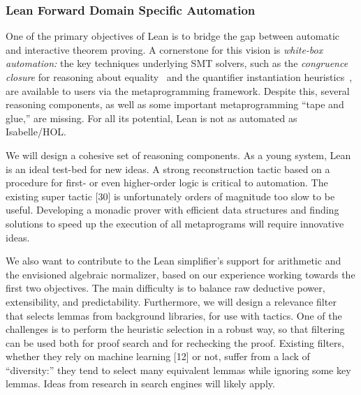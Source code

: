 \documentclass[11pt]{amsart}  %
\begin{document}
\subsubsection{Lean Forward Domain Specific Automation}
One of the primary objectives of Lean is to bridge the gap between automatic and interactive theorem proving. A cornerstone for this vision is \emph{white-box automation:} the key techniques underlying SMT solvers, such as the \emph{congruence closure} for reasoning about equality~\cite{MR3536762} and the quantifier instantiation heuristics~\cite{MR2458080}, are available to users via the metaprogramming framework. Despite this, several reasoning components, as well as some important metaprogramming ``tape and glue,'' are missing. For all its potential, Lean is not as automated as Isabelle/HOL.

We will design a cohesive set of reasoning components. As a young system, Lean is an ideal test-bed for new ideas. A strong reconstruction tactic based on a procedure for first- or even higher-order logic is critical to automation. The existing super tactic [30] is unfortunately orders of magnitude too slow to be useful. Developing a monadic prover with efficient data structures and finding solutions to speed up the execution of all metaprograms will require innovative ideas.

We also want to contribute to the Lean simplifier’s support for arithmetic and the envisioned algebraic normalizer, based on our experience working towards the first two objectives. The main difficulty is to balance raw deductive power, extensibility, and predictability. Furthermore, we will design a relevance filter that selects lemmas from background libraries, for use with tactics. One
of the challenges is to perform the heuristic selection in a robust way, so that filtering can be used both for proof search and for rechecking the proof. Existing filters, whether they rely on machine learning [12] or not, suffer from a lack of ``diversity:'' they tend to select many equivalent lemmas
while ignoring some key lemmas. Ideas from research in search engines will likely apply.

\end{document}
